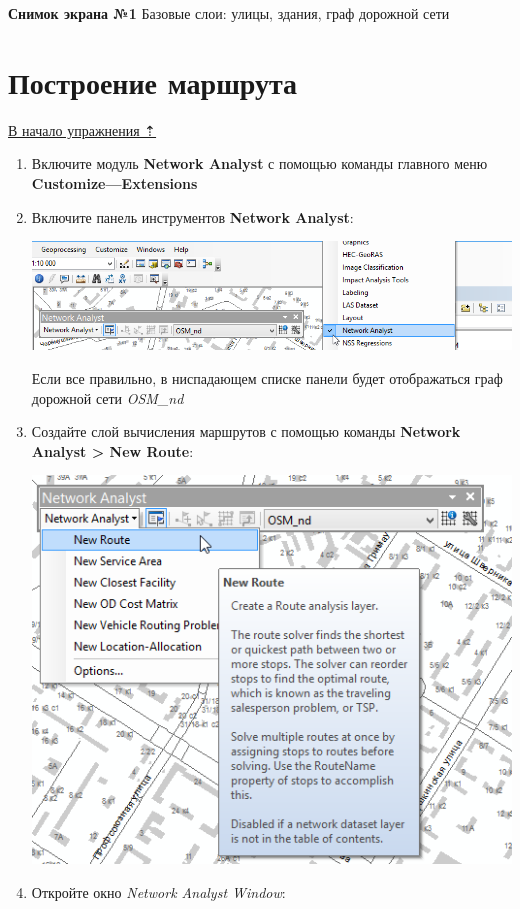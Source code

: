 \documentclass[]{book}
\theoremstyle{definition}
\theoremstyle{definition}
\theoremstyle{definition}
\theoremstyle{remark}
\begin{document}
\textbf{Снимок экрана №1} Базовые слои: улицы, здания, граф дорожной
сети

\hypertarget{network-analysis-route}{%
\section{Построение маршрута}\label{network-analysis-route}}

\protect\hyperlink{network-analysis}{В начало упражнения ⇡}

\begin{enumerate}
\def\labelenumi{\arabic{enumi}.}
\item
  Включите модуль \textbf{Network Analyst} с помощью команды главного
  меню \textbf{Customize---Extensions}
\item
  Включите панель инструментов \textbf{Network Analyst}:

  \includegraphics{images/Ex12/image7.png}

  Если все правильно, в ниспадающем списке панели будет отображаться
  граф дорожной сети \emph{OSM\_nd}
\item
  Создайте слой вычисления маршрутов с помощью команды \textbf{Network
  Analyst \textgreater{} New Route}:

  \includegraphics{images/Ex12/image8.png}
\item
  Откройте окно \emph{Network Analyst Window}:


\end{enumerate}
\end{document}
